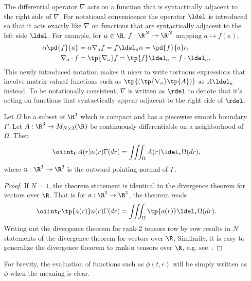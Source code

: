 \begin{rk}
The differential operator $\nabla$ acts on a function that is syntactically adjacent to the right side of $\nabla$. 
For notational convenicence the operator $\ldel$ is introduced so that it acts exactly like $\nabla$ on functions that are
syntactically adjacent to the left side $\ldel$.  For example, for $\alpha\in \R$, $f:\R^N\to \R^N$ mapping $a\mapsto f(a)$,
\begin{align}
    \alpha \pd{f}{a} &= \alpha \nabla_a f = f \ldel_a \alpha = \pd{f}{a} \alpha \\
    \nabla_a \cdot f &= \tp{\nabla_a} f = \tp{f} \ldel_a = f \cdot \ldel_a.
\end{align}
This newly introduced notation makes it nicer to write tortuous expressions that involve matrix
valued functions such as $\tp{(\tp{\nabla_a} \tp{A})}$ as $A \ldel_a$ instead.
To be notationally consistent, $\nabla$ is written as $\rdel$ to denote that it's acting on
functions that syntactically appear adjacent to the right side of $\rdel$.
\end{rk}

\begin{thm}
    Let $\Omega$ be a subset of $\R^3$ which is compact and has
    a piecewise smooth boundary $\Gamma$.
    Let $A:\R^3 \to M_{N\times 3}(\R)$ be continuously differentiable
    on a neighborhood of $\Omega$.  Then
    \begin{equation}
        \oiint_\Gamma A(r) n(r) \Gamma(dr)
        = \iiint_\Omega A(r) \ldel_r \Omega(dr),
    \end{equation}
    where $n:\R^3\to \R^3$ is the outward pointing normal of $\Gamma$.
\end{thm}
\begin{proof}
    If $N=1$, the theorem statement is identical to the divergence theorem for vectors over $\R$.
    That is for $a:\R^3 \to \R^3$, the theorem reads
    \begin{equation}
        \oiint_\Gamma \tp{a(r)} n(r) \Gamma(dr)
        = \iiint_\Omega  \tp{a(r)} \ldel_r \Omega(dr).
    \end{equation}
    Writing out the divergence theorem for rank-2 tensors row by row results in $N$
    statements of the divergence theorem for vectors over $\R$.
    Similarily,  it is easy to generalize the divergence theorem to rank-n tensors over $\R$,
    e.g. see~\cite{riley}.
\end{proof}

\begin{rk}
    For brevity, the evaluation of functions such as $\phi(t,r)$ will be simply written
    as $\phi$ when the meaning is clear.
\end{rk}

